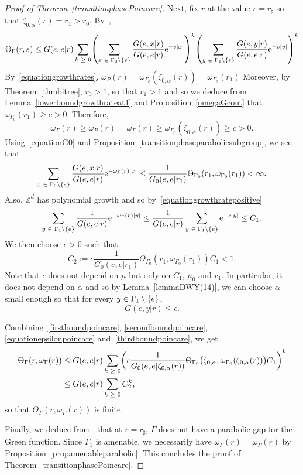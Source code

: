 \documentclass[AHL,Unicode,longabstracts]{cedram}
\newcommand{\Z}{\mathbb{Z}}
\newcommand{\rme}{\mathrm{e}}
\let\originalleft\left
\let\originalright\right
\renewcommand{\left}{\mathopen{}\mathclose\bgroup\originalleft}
\renewcommand{\right}{\aftergroup\egroup\originalright}
\let\oldin\in
\renewcommand{\in}{\mathchoice{\oldin}{\oldin}{\,\oldin\,}{\,\oldin\,}}
\let\oldge\ge
\renewcommand{\ge}{\mathchoice{\oldge}{\oldge}{\,\oldge\,}{\,\oldge\,}}
\begin{document}
\begin{proof}[{Proof of Theorem~\ref{transitionphasePoincare}}]
Next, fix $r$ at the value $r=r_\sharp$ so that $\zeta_{0,\alpha}(r)=r_1>r_0$. By~\cite[(15)]{DWY},
\[
\Theta_{\Gamma}(r,s)\leq G(e,e|r)\sum_{k\ge 0}\left (\sum_{x\in \Gamma_0\setminus\{e\}}\frac{G(e,x|r)}{G(e,e|r)}\rme^{-s|x|}\right)^k\left (\sum_{y\in \Gamma_1\setminus\{e\}}\frac{G(e,y|r)}{G(e,e|r)}\rme^{-s|y|}\right)^k
\]
By~\eqref{equationgrowthrates}, $\omega_P(r)=\omega_{\Gamma_0}(\zeta_{0,\alpha}(r))=\omega_{\Gamma_0}(r_1)$ Moreover, by Theorem~\ref{thmbitree}, $r_0>1$, so that $r_1>1$ and so we deduce from Lemma~\ref{lowerboundgrowthrateat1} and Proposition~\ref{omegaGcont} that $\omega_{\Gamma_0}(r_1)\geq c>0$. Therefore,
\begin{equation}\label{equationgrowthratepositive}
\omega_{\Gamma}(r)\geq \omega_P(r) = \omega_{\Gamma}(r)\geq \omega_{\Gamma_0}(\zeta_{0,\alpha}(r)) \geq c>0.
\end{equation}
Using~\eqref{equationG0} and Proposition~\ref{transitionphaseparabolicsubgroup}, we see that
\begin{equation}\label{firstboundpoincare}
\sum_{x\in \Gamma_0\setminus\{e\}}\frac{G(e,x|r)}{G(e,e|r)}\rme^{-\omega_\Gamma(r)|x|}\leq \frac{1}{G_0(e,e|r_1)}\Theta_{\Gamma_0}(r_1,\omega_{\Gamma_0}(r_1))
<\infty.
\end{equation}
Also, $\Z^d$ has polynomial growth and so by~\eqref{equationgrowthratepositive}
\begin{equation}\label{secondboundpoincare}
\sum_{y\in \Gamma_1\setminus\{e\}}\frac{1}{G(e,e|r)}\rme^{-\omega_\Gamma(r)|y|}\leq \frac{1}{G(e,e|r)}\sum_{y\in \Gamma_1\setminus\{e\}}\rme^{-c|y|}\leq C_1.
\end{equation}
We then choose $\epsilon>0$ such that
\begin{equation}\label{equationepsilonpoincare}
C_2:=\epsilon\frac{1}{G_0(e,e|r_1)}\Theta_{\Gamma_0}(r_1,\omega_{\Gamma_0}(r_1))C_1<1.
\end{equation}
Note that $\epsilon$ does not depend on $\mu$ but only on $C_1$, $\mu_0$ and $r_1$. In particular, it does not depend on $\alpha$ and so by Lemma~\ref{lemmaDWY(14)}, we can choose $\alpha$ small enough so that for every $y\in \Gamma_1\setminus \{e\}$,
\[
G(e,y|r)\leq \epsilon.
\]


Combining~\eqref{firstboundpoincare}, \eqref{secondboundpoincare}, \eqref{equationepsilonpoincare} and~\eqref{thirdboundpoincare}, we get
\begin{align*}
\Theta_{\Gamma}(r,\omega_\Gamma(r))&\leq G(e,e|r)\sum_{k\ge 0}\left(\epsilon\frac{1}{G_0(e,e|\zeta_{0,\alpha}(r))}\Theta_{\Gamma_0}\bigl(\zeta_{0,\alpha},\omega_{\Gamma_0}(\zeta_{0,\alpha}(r))\bigr)C_1\right)^k\\
&\leq G(e,e|r)\sum_{k\ge 0}C_2^k,
\end{align*}
so that $\Theta_{\Gamma}(r,\omega_\Gamma(r))$ is finite.

Finally, we deduce from~\cite[Lemma~3.7]{DWY} that at $r=r_\sharp$, $\Gamma$ does not have a parabolic gap for the Green function. Since $\Gamma_1$ is amenable, we necessarily have $\omega_\Gamma(r)=\omega_P(r)$ by Proposition~\ref{propamenableparabolic}. This concludes the proof of Theorem~\ref{transitionphasePoincare}.
\end{proof}
\end{document}
